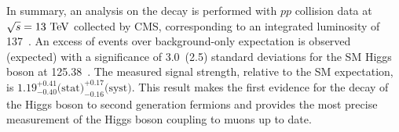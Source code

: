 In summary, an analysis on the \hmm decay is performed with $pp$ collision data at $\sqrt{s} = 13~\mbox{TeV}$ collected by CMS, corresponding to an integrated luminosity of 137~\invfb.
An excess of events over background-only expectation is observed (expected) with a significance of 3.0~(2.5) standard deviations for the SM Higgs boson at 125.38~\GeV. 
The measured signal strength, relative to the SM expectation, is $1.19^{+0.41}_{-0.40} \text{(stat)}^{+0.17}_{-0.16} \text{(syst)}$.
This result makes the first evidence for the decay of the Higgs boson to second generation fermions and provides the most precise measurement of the Higgs boson coupling to muons up to date. 
